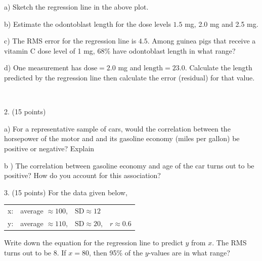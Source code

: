 \documentclass[10pt]{article}
\begin{document}
\hspace{20pt} a) Sketch the regression line in the above plot.
\medskip

\hspace{20pt} b) Estimate the odontoblast length for the dose levels $1.5$ mg, 2.0 mg and 2.5 mg.
\vspace{1.4in}

\hspace{20pt} c) The RMS error for the regression line is $4.5$.
Among guinea pigs that receive a vitamin C dose level of 1 mg, 68\% 
  have odontoblast length in what range?
\vspace{1.2in}

\hspace{20pt} d) One measurement has $\mbox{dose}=2.0$ mg and 
$\mbox{length}=23.0$. Calculate the length predicted by the regression
line then calculate the error (residual) for that value.

\vfill
\eject
{\ }


2. (15 points) 

\hspace{20pt} a) For a representative sample of cars, would the correlation between the
horsepower of the motor and  and its gasoline economy (miles per gallon) be positive or negative?  Explain
\vspace{1.75in}

\hspace{20pt} b ) The correlation between gasoline economy and age of the car turns out to 
be positive?  How do you account for this association?
\vspace{2in}

3. (15 points)
For the data given below, \vspace{-8pt}
\begin{center}
\begin{tabular}{llll}
x: & average $\approx 100$, & $\mbox{SD}\approx 12$\\
y: & average $\approx 110$, & $\mbox{SD}\approx 20$,  & $r\approx 0.6$\\
\end{tabular}\vspace{-8pt}
\end{center}
Write down the equation for the regression line to predict $y$ from $x$.
The RMS turns out to be 8.  
If $x=80$, then 95\% of the $y$-values are in what range?
\vspace{1.8in}
\end{document}
